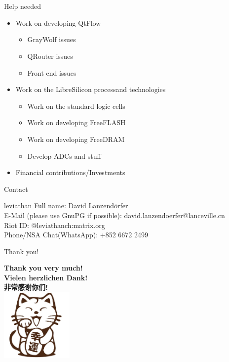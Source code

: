 \documentclass[9pt]{beamer}
\begin{document}
\section[Conclusion]{}

\begin{frame}{Help needed}
	\begin{itemize}
		\item Work on developing QtFlow
		\begin{itemize}
			\item GrayWolf issues\footnotemark
			\item QRouter issues\footnotemark
			\item Front end issues\footnotemark
		\end{itemize}
		\item Work on the LibreSilicon process\footnotemark and technologies\footnotemark
		\begin{itemize}
			\item Work on the standard logic cells
			\item Work on developing FreeFLASH
			\item Work on developing FreeDRAM
			\item Develop ADCs and stuff
		\end{itemize}
		\item Financial contributions/Investments
	\end{itemize}

\end{frame}

\begin{frame}{Contact}
	\begin{block}{leviathan}
		Full name: David Lanzendörfer \\
		E-Mail (please use GnuPG if possible): david.lanzendoerfer@lanceville.cn \\
		Riot ID: @leviathanch:matrix.org \\
		Phone/NSA Chat(WhatsApp): +852 6672 2499		
	\end{block}
\end{frame}

\begin{frame}{Thank you!}
	\begin{center}
		\textbf{Thank you very much!} \\
		\textbf{Vielen herzlichen Dank!} \\
		\textbf{\cjkfont 非常感谢你们!} \\
		\includegraphics[width=100pt]{cat.png}
	\end{center}
\end{frame}
\end{document}
